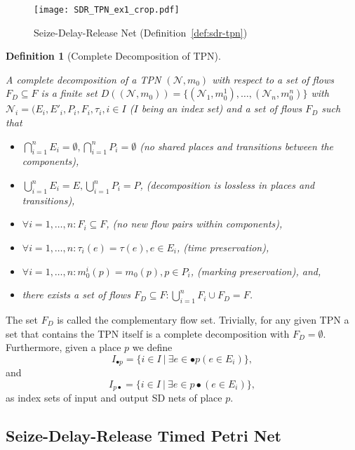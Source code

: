 \documentclass[11pt]{article}
\newtheorem{mydef}{Definition}
\begin{document}
\begin{figure}[t!]
	\centering
	\texttt{[image: SDR\_TPN\_ex1\_crop.pdf]}
	\caption{Seize-Delay-Release Net (Definition~\ref{def:sdr-tpn})}
	\label{fig:sdr-net}  
\end{figure}
\begin{mydef} [Complete Decomposition of TPN] \label{def:decompose_n}
	\begin{sloppypar}A complete decomposition of a TPN $(\mathcal{N}, m_0)$ with respect to a 
		set of flows $F_D \subseteq F$ is a finite set $D((\mathcal{N}, m_0)) = \{(\mathcal{N}_1, m_0^1), \ldots, (\mathcal{N}_n, m_0^n)\}$ with $\mathcal{N}_i = (E_i, E'_i,P_i, F_i, \tau_i, i \in I$ ($I$ being an index set) and 
		a set of flows $F_D$ such that \end{sloppypar} \begin{itemize}
		\item $\bigcap_{i=1}^n E_i = \emptyset,\bigcap_{i=1}^n P_i = \emptyset$ (no shared places and transitions between the components),
		\item $\bigcup_{i=1}^n E_i = E, \bigcup_{i=1}^nP_i = P$, (decomposition is lossless in places and transitions),
		\item $\forall i = 1,\ldots, n: F_i \subseteq F$, (no new flow pairs within components),
		\item $\forall i = 1,\ldots, n: \tau_i(e) = \tau(e), e \in E_i$, (time preservation), 
		\item $\forall i = 1,\ldots, n:  m_0^i(p) = m_0(p), p \in P_i$, (marking preservation), and, 
		\item there exists a set of flows $F_D \subseteq F: \bigcup_{i=1}^n F_i \cup F_D = F$. 
	\end{itemize}
\end{mydef} \noindent The set $F_D$ is called the complementary flow set. 
Trivially, for any given TPN a set that contains the TPN itself is a complete decomposition 
with $F_D = \emptyset$. Furthermore, given a place $p$ we define $$I_{\bullet p} = \{i \in I \ | \ \exists e \in \bullet p(e \in E_i)  \},$$ and $$I_{p \bullet}  = \{i \in I \ | \ \exists e \in p\bullet(e \in E_i)  \}, $$
as index sets of input and output SD nets of place $p$. 

\subsection{Seize-Delay-Release Timed Petri Net}
\end{document}
